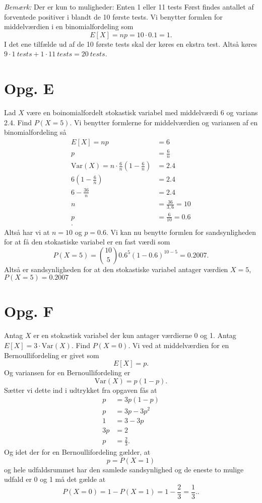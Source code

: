 \documentclass[12pt]{article}
\theoremstyle{definition}
\begin{document}
\textit{Bemærk:} Der er kun to muligheder: Enten 1 eller 11 tests
\bigbreak
Først findes antallet af forventede positiver i blandt de 10 første tests. Vi benytter formlen for middelværdien i en binomialfordeling som
\[ 
  E[X] = np = 10\cdot \num{0,1} = 1
.\]
I det ene tilfælde ud af de 10 første tests skal der køres en ekstra test. Altså køres $9\cdot \qty{1}{tests}  + 1 \cdot \qty{11}{tests}  = \qty{20}{tests}$. 


\section*{Opg. E}
Lad $X$ være en boinomialfordelt stokastisk variabel med middelværdi 6 og varians \num{2,4}. Find $P(X=5)$.
\bigbreak
Vi benytter formlerne for middelværdien og variansen af en binomialfordeling så
\begin{align*}
  E[X] = np &= 6 \\
  p &= \frac{6}{n} \\
  \mathrm{Var}(X) = n \cdot \frac{6}{n} (1 - \frac{6}{n}) &= \num{2,4} \\
  6(1-\frac{6}{n}) &= \num{2,4}  \\
  6 - \frac{36}{n} &= \num{2,4} \\
  n &= \frac{36}{3,6} = 10 \\
  p &= \frac{6}{10} = \num{0,6}  \\
.\end{align*}
Altså har vi at $n = 10$ og $p = \num{0,6}$. Vi kan nu benytte formlen for sandsynligheden for at få den stokastiske variabel er en fast værdi som
\[ 
  P(X = 5) = \binom{10}{5}\num{0,6}^5(1-\num{0,6})^{10-5} = \num{0,2007} 
.\]
Altså er sandsynligheden for at den stokastiske variabel antager værdien $X = 5$, $P(X = 5) = \num{0,2007}$

\section*{Opg. F}
Antag $X$ er en stokastisk variabel der kun antager værdierne 0 og 1. Antag $E[X] = 3\cdot \mathrm{Var}(X)$. Find $P(X = 0)$.
\bigbreak
Vi ved at middelværdien for en Bernoullifordeling er givet som
\[ 
  E[X] = p
.\]
Og variansen for en Bernoullifordeling er
\[ 
  \mathrm{Var}(X) = p(1-p)
.\]
Sætter vi dette ind i udtrykket fra opgaven fås at
\begin{align*}
  p &= 3p(1-p) \\
  p &= 3p - 3p^2 \\
  1 &= 3 - 3p \\
  3p &= 2 \\
  p &= \frac{2}{3}
.\end{align*}
Og idet der for en Bernoullifordeling gælder, at
\[ 
p = P(X = 1)
\]
og hele udfaldsrummet har den samlede sandsynlighed og de eneste to mulige udfald er 0 og 1 må det gælde at
\[ 
P(X = 0) = 1 - P(X = 1) = 1 - \frac{2}{3} = \frac{1}{3}.
.\]
\end{document}
